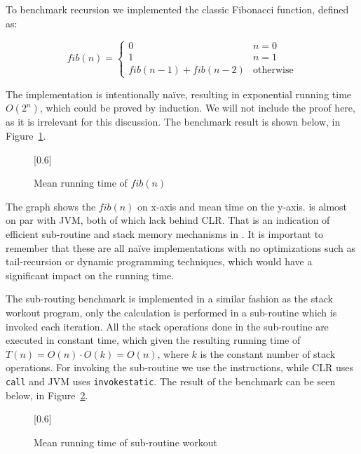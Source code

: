 
To benchmark recursion we implemented the classic Fibonacci function, defined
as:

\begin{equation*}
  fib(n) = \begin{cases}
    0                   & n = 0 \\
    1                   & n = 1 \\
    fib(n-1) + fib(n-2) & \text{otherwise}
  \end{cases}
\end{equation*}

The implementation is intentionally na\"ive, resulting in exponential running
time $O(2^n)$, which could be proved by induction. We will not include the proof
here, as it is irrelevant for this discussion. The benchmark result is shown
below, in Figure~\ref{fig:eval:benchmark:fib}.

\begin{figure}[H]
  \centering
  \scalebox{0.8}[0.6]{}
  \caption{Mean running time of $fib(n)$}
\label{fig:eval:benchmark:fib}
\end{figure}

The graph shows the $fib(n)$ on x-axis and mean time on the y-axis. \thename{}
is almost on par with JVM, both of which lack behind CLR. That is an indication
of efficient sub-routine and stack memory mechanisms in \thename{}. It is
important to remember that these are all na\"ive implementations with no
optimizations such as tail-recursion or dynamic programming techniques, which
would have a significant impact on the running time.


The sub-routing benchmark is implemented in a similar fashion as the stack
workout program, only the calculation is performed in a sub-routine which is
invoked each iteration. All the stack operations done in the sub-routine are
executed in constant time, which given the resulting running time of
$T(n) = O(n) \cdot O(k) = O(n)$, where $k$ is the constant number of stack
operations. For invoking the sub-routine we use the  instructions,
while CLR uses {\tt call} and JVM uses {\tt invokestatic}. The result of the
benchmark can be seen below, in Figure~\ref{fig:eval:benchmark:invoc}.

\begin{figure}[H]
  \centering
  \scalebox{0.8}[0.6]{}
  \caption{Mean running time of sub-routine workout}
\label{fig:eval:benchmark:invoc}
\end{figure}

